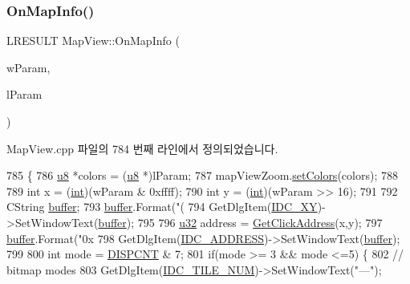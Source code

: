 \subsubsection{\texorpdfstring{On\+Map\+Info()}{OnMapInfo()}}
{\footnotesize\ttfamily L\+R\+E\+S\+U\+LT Map\+View\+::\+On\+Map\+Info (\begin{DoxyParamCaption}\item[{W\+P\+A\+R\+AM}]{w\+Param,  }\item[{L\+P\+A\+R\+AM}]{l\+Param }\end{DoxyParamCaption})}



Map\+View.\+cpp 파일의 784 번째 라인에서 정의되었습니다.


\begin{DoxyCode}
785 \{
786   \mbox{\hyperlink{_system_8h_aed742c436da53c1080638ce6ef7d13de}{u8}} *colors = (\mbox{\hyperlink{_system_8h_aed742c436da53c1080638ce6ef7d13de}{u8}} *)lParam;
787   mapViewZoom.\mbox{\hyperlink{class_zoom_control_a97501cc16d3068eefa1b5d9d23e9d0d9}{setColors}}(colors);
788 
789   \textcolor{keywordtype}{int} x = (\mbox{\hyperlink{_util_8cpp_a0ef32aa8672df19503a49fab2d0c8071}{int}})(wParam & 0xffff);
790   \textcolor{keywordtype}{int} y = (\mbox{\hyperlink{_util_8cpp_a0ef32aa8672df19503a49fab2d0c8071}{int}})(wParam >> 16);
791   
792   CString \mbox{\hyperlink{_g_b_a_8cpp_a28d4d3d8445e73a696b2d6f7eadabd96}{buffer}};
793   \mbox{\hyperlink{_g_b_a_8cpp_a28d4d3d8445e73a696b2d6f7eadabd96}{buffer}}.Format(\textcolor{stringliteral}{"(%
794   GetDlgItem(\mbox{\hyperlink{resource_8h_a5b3f7b85cc5d8e5338510582cd3225f7}{IDC\_XY}})->SetWindowText(\mbox{\hyperlink{_g_b_a_8cpp_a28d4d3d8445e73a696b2d6f7eadabd96}{buffer}});
795 
796   \mbox{\hyperlink{_system_8h_a10e94b422ef0c20dcdec20d31a1f5049}{u32}} address = \mbox{\hyperlink{class_map_view_ad05aa1227f5a62d8e9477eeeec37115c}{GetClickAddress}}(x,y);
797   \mbox{\hyperlink{_g_b_a_8cpp_a28d4d3d8445e73a696b2d6f7eadabd96}{buffer}}.Format(\textcolor{stringliteral}{"0x%
798   GetDlgItem(\mbox{\hyperlink{resource_8h_af0726d27cf7b7070867a81fde283a218}{IDC\_ADDRESS}})->SetWindowText(\mbox{\hyperlink{_g_b_a_8cpp_a28d4d3d8445e73a696b2d6f7eadabd96}{buffer}});
799 
800   \textcolor{keywordtype}{int} mode = \mbox{\hyperlink{_globals_8cpp_a843ca20ea4281609edb7d32392e31de8}{DISPCNT}} & 7;  
801   \textcolor{keywordflow}{if}(mode >= 3 && mode <=5) \{
802     \textcolor{comment}{// bitmap modes}
803     GetDlgItem(\mbox{\hyperlink{resource_8h_a91b7e470182ad94661b7fbe26c057e38}{IDC\_TILE\_NUM}})->SetWindowText(\textcolor{stringliteral}{"---"});
}}
\end{DoxyCode}
